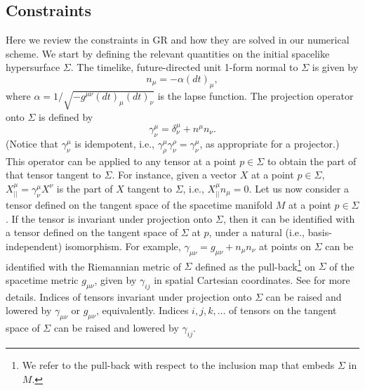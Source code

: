 \documentclass[a4paper,11pt]{article}
\numberwithin{equation}{section}
\begin{document}
\subsection{Constraints}
\label{sec:constr}

Here we review the constraints in GR and how they are solved in our numerical scheme.
We start by defining the relevant quantities on the initial spacelike hypersurface $\Sigma$. %
The timelike, future-directed unit 1-form normal to $\Sigma$ is given by
\begin{equation}
\label{eq:uninormal}
n_\mu=-\alpha (dt)_\mu,
\end{equation}
where $\alpha=1/\sqrt{-g^{\mu\nu}(dt)_\mu (dt)_\nu}$ is the lapse function. 
The projection operator onto $\Sigma$ is defined by
\begin{equation}
\gamma^\mu_\nu=\delta^\mu_\nu+n^\mu n_\nu.
\end{equation}
(Notice that $\gamma^\mu_\nu$ is idempotent, i.e., $\gamma^\mu_\rho \gamma^\rho_\nu=\gamma^\mu_\nu$, as appropriate for a projector.)
This operator can be applied to any tensor at a point $p\in\Sigma$ to obtain the part of that tensor tangent to $\Sigma$. For instance, given a vector $X$ at a point $p\in\Sigma$, $X_{||}^\mu=\gamma^\mu_\nu X^\nu$ is the part of $X$ tangent to $\Sigma$, i.e., $X_{||}^\mu n_\mu=0$. 
Let us now consider a tensor defined on the tangent space of the spacetime manifold $M$ at a point $p\in\Sigma$. If the tensor is invariant under projection onto $\Sigma$, then it can be identified with a tensor defined on the tangent space of $\Sigma$ at $p$, under a natural (i.e., basis-independent) isomorphism. For example, $\gamma_{\mu\nu}=g_{\mu\nu}+n_\mu n_\nu$ at points on $\Sigma$ can be identified with the Riemannian metric of $\Sigma$ defined as the pull-back\footnote{We refer to the pull-back with respect to the inclusion map that embeds $\Sigma$ in $M$.} on $\Sigma$ of the spacetime metric $g_{\mu\nu}$, given by $\gamma_{ij}$ in spatial Cartesian coordinates. See \cite{Hawking:1973uf} for more details. Indices of tensors invariant under projection onto $\Sigma$ can be raised and lowered by $\gamma_{\mu\nu}$ or $g_{\mu\nu}$, equivalently. Indices $i,j,k,\dots$ of tensors on the tangent space of $\Sigma$ can be raised and lowered by $\gamma_{ij}$.
\end{document}
